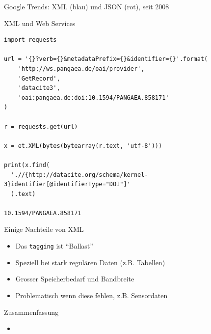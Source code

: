 \documentclass{beamer}
\begin{document}
{
	\begin{frame}[plain]
		\vspace{7cm}
		\begin{center}
Google Trends: XML (blau) und JSON (rot), seit 2008
		\end{center}
	\end{frame}
}

\begin{frame}[fragile]{XML und Web Services}
	
	\lstset{language=Python}
	\scriptsize
	\begin{lstlisting}
import requests
	
url = '{}?verb={}&metadataPrefix={}&identifier={}'.format(
	'http://ws.pangaea.de/oai/provider',
	'GetRecord', 
	'datacite3', 
	'oai:pangaea.de:doi:10.1594/PANGAEA.858171'
)
	
r = requests.get(url)
	
x = et.XML(bytes(bytearray(r.text, 'utf-8')))
	
print(x.find(
  './/{http://datacite.org/schema/kernel-3}identifier[@identifierType="DOI"]'
  ).text)
 
10.1594/PANGAEA.858171
	\end{lstlisting}
	
\end{frame}


\begin{frame}{Einige Nachteile von XML}
	
	\begin{itemize}
		\item Das \texttt{tagging} ist ``Ballast''
		\item Speziell bei stark regulären Daten (z.B. Tabellen) 
		\item Grosser Speicherbedarf und Bandbreite
		\item Problematisch wenn diese fehlen, z.B. Sensordaten
	\end{itemize}
	
\end{frame}

\begin{frame}{Zusammenfassung}
	
	\begin{itemize}
		\item
	\end{itemize}
	
\end{frame}
\end{document}
